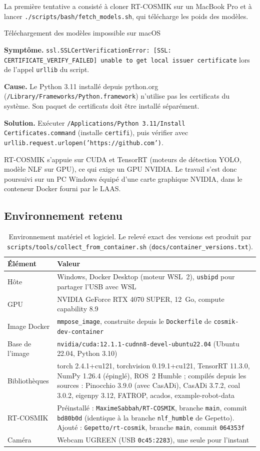 \documentclass[11pt,a4paper]{article}
\newcommand{\symptome}[1]{\par\noindent\textbf{Symptôme.} #1}
\newcommand{\cause}[1]{\par\smallskip\noindent\textbf{Cause.} #1}
\newcommand{\solution}[1]{\par\smallskip\noindent\textbf{Solution.} #1}
\newcommand{\code}[1]{\texttt{\small #1}}
\begin{document}
La première tentative a consisté à cloner RT-COSMIK sur un MacBook Pro et à lancer \code{./scripts/bash/fetch\_models.sh}, qui télécharge les poids des modèles.

\begin{probleme}{Téléchargement des modèles impossible sur macOS}
\symptome{\code{ssl.SSLCertVerificationError: [SSL: CERTIFICATE\_VERIFY\_FAILED] unable to get local issuer certificate} lors de l'appel \code{urllib} du script.}
\cause{Le Python 3.11 installé depuis python.org (\code{/Library/Frameworks/Python.framework}) n'utilise pas les certificats du système. Son paquet de certificats doit être installé séparément.}
\solution{Exécuter \code{/Applications/Python 3.11/Install Certificates.command} (installe \code{certifi}), puis vérifier avec \code{urllib.request.urlopen('https://github.com')}.}
\end{probleme}

RT-COSMIK s'appuie sur CUDA et TensorRT (moteurs de détection YOLO, modèle NLF sur GPU), ce qui exige un GPU NVIDIA. Le travail s'est donc poursuivi sur un PC Windows équipé d'une carte graphique NVIDIA, dans le conteneur Docker fourni par le LAAS.

\subsection{Environnement retenu}

\begin{table}[H]
\centering
\begin{tabularx}{\textwidth}{@{}lX@{}}
\toprule
\textbf{Élément} & \textbf{Valeur} \\
\midrule
Hôte & Windows, Docker Desktop (moteur WSL~2), \code{usbipd} pour partager l'USB avec WSL \\
GPU & NVIDIA GeForce RTX 4070 SUPER, 12~Go, compute capability 8.9 \\
Image Docker & \code{mmpose\_image}, construite depuis le \code{Dockerfile} de \code{cosmik-dev-container} \\
Base de l'image & \code{nvidia/cuda:12.1.1-cudnn8-devel-ubuntu22.04} (Ubuntu 22.04, Python 3.10) \\
Bibliothèques & torch 2.4.1+cu121, torchvision 0.19.1+cu121, TensorRT 11.3.0, NumPy 1.26.4 (épinglé), ROS~2 Humble ; compilés depuis les sources : Pinocchio 3.9.0 (avec CasADi), CasADi 3.7.2, coal 3.0.2, eigenpy 3.12, FATROP, acados, example-robot-data \\
RT-COSMIK & Préinstallé : \code{MaximeSabbah/RT-COSMIK}, branche \code{main}, commit \code{bd80b0d} (identique à la branche \code{nlf\_humble} de Gepetto). Ajouté : \code{Gepetto/rt-cosmik}, branche \code{main}, commit \code{064353f} \\
Caméra & Webcam UGREEN (USB \code{0c45:2283}), une seule pour l'instant \\
\bottomrule
\end{tabularx}
\caption{Environnement matériel et logiciel. Le relevé exact des versions est produit par \code{scripts/tools/collect\_from\_container.sh} (\code{docs/container\_versions.txt}).}
\end{table}
\end{document}

